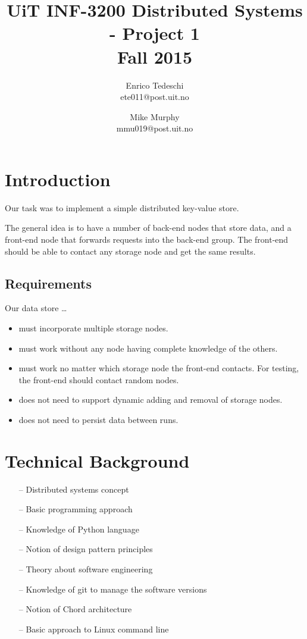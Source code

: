 \documentclass[11pt,conference]{IEEEtran}
\title{UiT INF-3200 Distributed Systems - Project 1\\Fall 2015}
\author{Enrico Tedeschi\\ete011@post.uit.no
    \and Mike Murphy\\mmu019@post.uit.no}
\begin{document}
\maketitle


\section{Introduction}

Our task was to implement a simple distributed key-value store.

The general idea is to have a number of back-end nodes that store data, and a
front-end node that forwards requests into the back-end group. The front-end
should be able to contact any storage node and get the same results.


\subsection{Requirements}

Our data store \ldots

\begin{itemize}
\item must incorporate multiple storage nodes.
\item must work without any node having complete knowledge of the others.
\item must work no matter which storage node the front-end contacts. For
    testing, the front-end should contact random nodes.
\item does not need to support dynamic adding and removal of storage nodes.
\item does not need to persist data between runs.
\end{itemize}


\section{Technical Background}



\begin{itemize} 
\item[--] Distributed systems concept
\item[--] Basic programming approach
\item[--] Knowledge of Python language
\item[--] Notion of design pattern principles
\item[--] Theory about software engineering
\item[--] Knowledge of git to manage the software versions
\item[--] Notion of Chord architecture
\item[--] Basic approach to Linux command line
\end{itemize}
\end{document}
